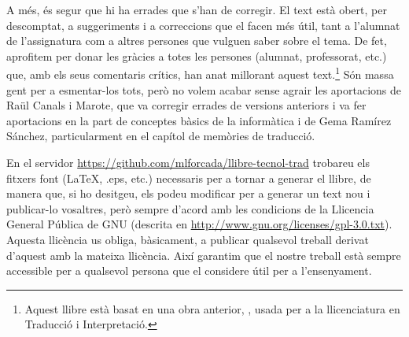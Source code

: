   A més, és segur que hi ha errades que s'han de corregir. El text
  està obert, per descomptat, a suggeriments i a correccions que el
  facen més útil, tant a l'alumnat de l'assignatura com a altres
  persones que vulguen saber sobre el tema.  De fet, aprofitem per
  donar les gràcies a totes les persones (alumnat, professorat, etc.)
  que, amb els seus comentaris crítics, han anat millorant aquest
  text.\footnote{Aquest llibre està basat en una obra anterior,
    \protect\citep{forcada09b}, usada per a la llicenciatura en
    Traducció i Interpretació.}  Són massa gent per a esmentar-los
  tots, però no volem acabar sense agrair les aportacions de Raül
  Canals i Marote, que va corregir errades de versions anteriors i va
  fer aportacions en la part de conceptes bàsics de la informàtica i
  de Gema Ramírez Sánchez, particularment en el capítol de memòries de
  traducció.

En el servidor \url{https://github.com/mlforcada/llibre-tecnol-trad}
trobareu els fitxers font (\LaTeX, .eps, etc.) necessaris per a tornar
a generar el llibre, de manera que, si ho desitgeu, els podeu
modificar per a generar un text nou i publicar-lo vosaltres, però
sempre d'acord amb les condicions de la Llicencia General Pública de
GNU (descrita en
\url{http://www.gnu.org/licenses/gpl-3.0.txt}). Aquesta llicència us
obliga, bàsicament, a publicar qualsevol treball derivat d'aquest amb
la mateixa llicència. Així garantim que el nostre treball està sempre
accessible per a qualsevol persona que el considere útil per a
l'ensenyament.


